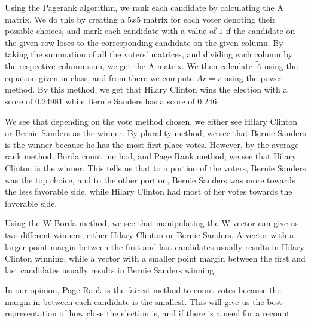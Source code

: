 \noindent Using the Pagerank algorithm, we rank each candidate by calculating the A matrix. We do this by creating a $5x5$ matrix for each voter denoting their possible choices, and mark each candidate with a value of $1$ if the candidate on the given row loses to the corresponding candidate on the given column. By taking the summation of all the voters' matrices, and dividing each column by the respective column sum, we get the A matrix. We then calculate $\tilde A$ using the equation given in class, and from there we compute $Ar=r$ using the power method. By this method, we get that Hilary Clinton wins the election with a score of $0.24981$ while Bernie Sanders has a score of $0.246$.\vspace{1pc}

\noindent We see that depending on the vote method chosen, we either see Hilary Clinton or Bernie Sanders as the winner. By plurality method, we see that Bernie Sanders is the winner because he has the most first place votes. However, by the average rank method, Borda count method, and Page Rank method, we see that Hilary Clinton is the winner. This tells us that to a portion of the voters, Bernie Sanders was the top choice, and to the other portion, Bernie Sanders was more towards the less favorable side, while Hilary Clinton had most of her votes towards the favorable side.\vspace{1pc}

\noindent Using the W Borda method, we see that manipulating the W vector can give us two different winners, either Hilary Clinton or Bernie Sanders. A vector with a larger point margin between the first and last candidates usually results in Hilary Clinton winning, while a vector with a smaller point margin between the first and last candidates usually results in Bernie Sanders winning.\vspace{1pc}

\noindent In our opinion, Page Rank is the fairest method to count votes because the margin in between each candidate is the smallest. This will give us the best representation of how close the election is, and if there is a need for a recount.\vspace{1pc}

